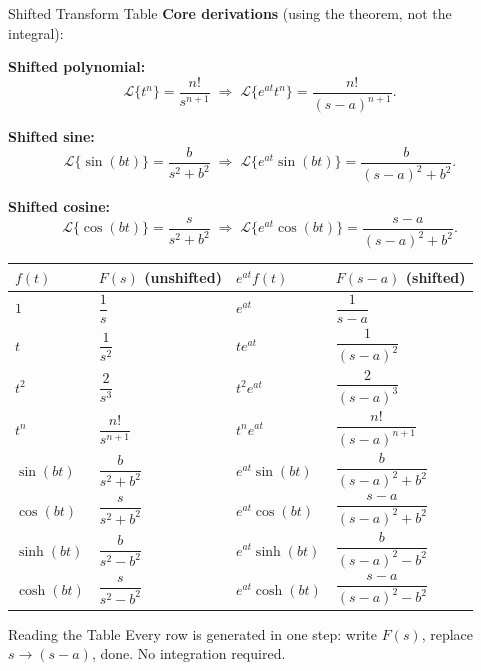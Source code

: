 \documentclass[12pt,a4paper]{article}
\begin{document}
\begin{infobox}{Shifted Transform Table}
\textbf{Core derivations} (using the theorem, not the integral):

\textbf{Shifted polynomial:}
\[
  \mathcal{L}\{t^n\} = \frac{n!}{s^{n+1}}
  \;\Longrightarrow\;
  \mathcal{L}\{e^{at}t^n\} = \frac{n!}{(s-a)^{n+1}}.
\]

\textbf{Shifted sine:}
\[
  \mathcal{L}\{\sin(bt)\} = \frac{b}{s^2+b^2}
  \;\Longrightarrow\;
  \mathcal{L}\{e^{at}\sin(bt)\} = \frac{b}{(s-a)^2+b^2}.
\]

\textbf{Shifted cosine:}
\[
  \mathcal{L}\{\cos(bt)\} = \frac{s}{s^2+b^2}
  \;\Longrightarrow\;
  \mathcal{L}\{e^{at}\cos(bt)\} = \frac{s-a}{(s-a)^2+b^2}.
\]
\end{infobox}

\vspace{0.5em}
\begin{center}
\begin{tabular}{@{}llll@{}}
\toprule
\textbf{$f(t)$} & \textbf{$F(s)$ (unshifted)} &
\textbf{$e^{at}f(t)$} & \textbf{$F(s-a)$ (shifted)} \\
\midrule
$1$           & $\dfrac{1}{s}$                   & $e^{at}$           & $\dfrac{1}{s-a}$ \\[8pt]
$t$           & $\dfrac{1}{s^2}$                 & $te^{at}$          & $\dfrac{1}{(s-a)^2}$ \\[8pt]
$t^2$         & $\dfrac{2}{s^3}$                 & $t^2e^{at}$        & $\dfrac{2}{(s-a)^3}$ \\[8pt]
$t^n$         & $\dfrac{n!}{s^{n+1}}$            & $t^n e^{at}$       & $\dfrac{n!}{(s-a)^{n+1}}$ \\[8pt]
$\sin(bt)$    & $\dfrac{b}{s^2+b^2}$             & $e^{at}\sin(bt)$   & $\dfrac{b}{(s-a)^2+b^2}$ \\[8pt]
$\cos(bt)$    & $\dfrac{s}{s^2+b^2}$             & $e^{at}\cos(bt)$   & $\dfrac{s-a}{(s-a)^2+b^2}$ \\[8pt]
$\sinh(bt)$   & $\dfrac{b}{s^2-b^2}$             & $e^{at}\sinh(bt)$  & $\dfrac{b}{(s-a)^2-b^2}$ \\[8pt]
$\cosh(bt)$   & $\dfrac{s}{s^2-b^2}$             & $e^{at}\cosh(bt)$  & $\dfrac{s-a}{(s-a)^2-b^2}$ \\[8pt]
\bottomrule
\end{tabular}
\end{center}

\begin{learnbox}{Reading the Table}
Every row is generated in one step: write $F(s)$, replace $s \to (s-a)$, done.
No integration required.
\end{learnbox}
\end{document}
